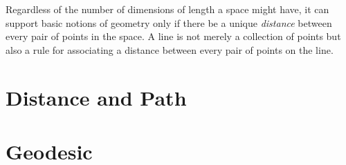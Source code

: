 \documentclass{tufte-book}
\begin{document}
Regardless of the number of dimensions of length a space might have, it can
support basic notions of geometry only if there be a unique \emph{distance}
between every pair of points in the space.  A line is not merely a collection
of points but also a rule for associating a distance between every pair of
points on the line.

\section{Distance and Path}

\section{Geodesic}

\appendix

\backmatter






\printindex
\end{document}
